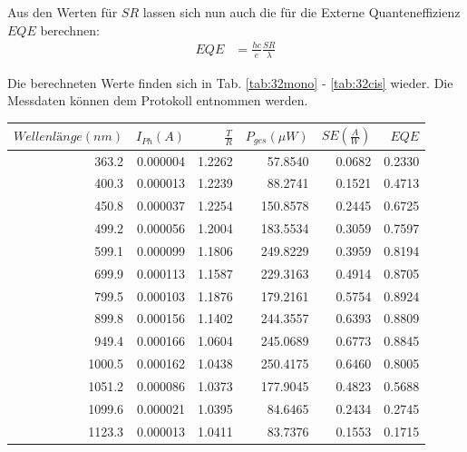Aus den Werten für $SR$ lassen sich nun auch die für die Externe Quanteneffizienz $EQE$ berechnen:
\begin{align}
EQE &= \frac{hc}{e} \frac{SR}{\lambda}
\label{eq:eqe}
\end{align}

Die berechneten Werte finden sich in Tab. \ref{tab:32mono} - \ref{tab:32cis} wieder. Die Messdaten können dem Protokoll entnommen werden.
\\

\begin{center}
\begin{tabular}{rrrrrr}
    $Wellenlänge (nm)$ &  $I_{Ph} (A)$ &    $\frac{T}{R}$ &  $P_{ges} (\mu W)$ &  $SE (\frac{A}{W})$ &       $EQE$ \\
    \hline
    363.2 &  0.000004 &  1.2262 &   57.8540 &  0.0682 &  0.2330 \\
    400.3 &  0.000013 &  1.2239 &   88.2741 &  0.1521 &   0.4713 \\
    450.8 &  0.000037 &  1.2254 &  150.8578 &  0.2445 &  0.6725 \\
    499.2 &  0.000056 &  1.2004 &  183.5534 &  0.3059 &  0.7597 \\
    599.1 &  0.000099 &  1.1806 &  249.8229 &  0.3959 &    0.8194 \\
    699.9 &  0.000113 &  1.1587 &  229.3163 &  0.4914 &  0.8705 \\
    799.5 &  0.000103 &  1.1876 &  179.2161 &  0.5754 &   0.8924 \\
    899.8 &  0.000156 &  1.1402 &  244.3557 &  0.6393 &  0.8809 \\
    949.4 &  0.000166 &  1.0604 &  245.0689 &  0.6773 &  0.8845 \\
    1000.5 &  0.000162 &  1.0438 &  250.4175 &  0.6460 &  0.8005 \\
    1051.2 &  0.000086 &  1.0373 &  177.9045 &  0.4823 &  0.5688 \\
    1099.6 &  0.000021 &  1.0395 &   84.6465 &  0.2434 &  0.2745 \\
    1123.3 &  0.000013 &  1.0411 &   83.7376 &  0.1553 &  0.1715 \\
    
\end{tabular}
\label{tab:32mono}
\end{center}

